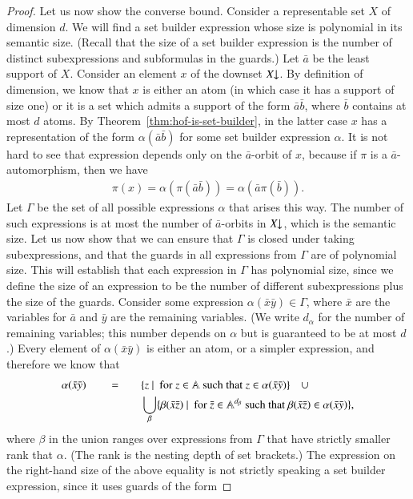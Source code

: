 \begin{proof}
  Let us now show the converse bound. Consider a representable set $X$ of dimension $d$.  We will find a set builder expression whose size is polynomial in its semantic size. (Recall that the size of a set builder expression is the number of distinct subexpressions and subformulas in the guards.)
  Let $\bar a$ be the least support of $X$. Consider an element $x$ of the downset $X\!\!\downarrow$. 
  By definition of dimension, we know that $x$  is either an atom (in which case it has a support of size one) or it is a set which admits a  support of the form $\bar a \bar b$, where $\bar b$ contains at most $d$ atoms. By   Theorem~\ref{thm:hof-is-set-builder}, in the latter case $x$ has a representation of the form  $\alpha(\bar a \bar b)$ for some set builder expression $\alpha$.  It is not hard to see that expression depends only on the $\bar a$-orbit of $x$, because if $\pi$ is a $\bar a$-automorphism, then we have 
  \begin{align*}
     \pi(x) = \alpha(\pi(\bar a \bar b)) = \alpha(\bar a \pi(\bar b)).
  \end{align*}
  Let $\Gamma$ be the set of all possible expressions $\alpha$ that arises this way. The number of such expressions is at most the  number of $\bar a$-orbits in $X\!\!\downarrow$, which is the semantic  size. Let us now show that we can ensure  that $\Gamma$ is closed under taking subexpressions, and that the guards in all expressions from $\Gamma$ are of polynomial size. This will establish that each expression in $\Gamma$ has polynomial size, since we define the size of an expression to be the number of different subexpressions plus the size of the guards. 
  Consider some expression $\alpha(\bar x \bar y) \in \Gamma$, where $\bar x$ are the variables for $\bar a$ and $\bar y$ are the remaining variables. (We write  $d_\alpha$ for the number of remaining variables; this number depends on $\alpha$ but is guaranteed to be at most $d$.)  Every element of $\alpha(\bar x \bar y)$ is either an atom, or a simpler expression, and therefore we know that 
  \begin{align*}
  \alpha(\bar x \bar y)\qquad  = \qquad   &
  \{ z \ |\ \text{ for }z \in \mathbb A \text{ such that }z \in \alpha(\bar x \bar y)\} \quad  \cup \\
  &
  \bigcup_{\beta} \{ \beta(\bar x \bar z)\ |\ \text{ for }\bar z \in \mathbb A^{d_\beta} \text{ such that }\beta(\bar  x \bar z) \in \alpha(\bar x \bar y)\},
  \end{align*}
  where $\beta$ in the union ranges over expressions from $\Gamma$ that have strictly smaller rank that $\alpha$. (The rank is the nesting depth of set brackets.) The expression on the right-hand size of the above equality is not strictly speaking a set builder expression, since it uses guards of the form  

\end{proof}
